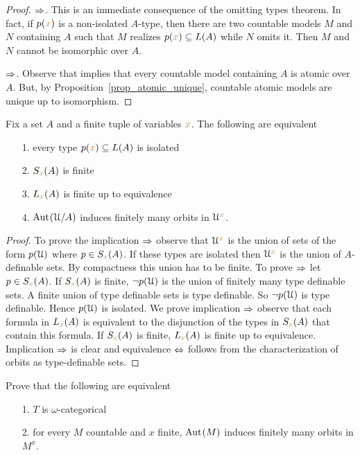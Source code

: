 \vspace*{-\parskip}
\begin{proof} $\Rightarrow$. This is an immediate consequence of the omitting types theorem.
In fact, if $p({\color{brown} x})$ is a non-isolated $A$-type, then there are two countable models $M$ and $N$ containing $A$ such that $M$ realizes $p({\color{brown} x})\subseteq L(A)$ while $N$ omits it.
Then $M$ and $N$ cannot be isomorphic over $A$.

$\Rightarrow$. Observe that  implies that every countable model containing $A$ is atomic over $A$.
But, by Proposition~\ref{prop_atomic_unique}, countable atomic models are unique up to isomorphism.
\end{proof}

\begin{proposition}\label{prop_ERNS_equivalents}
Fix a set $A$ and a finite tuple of variables ${\color{brown} x}$.
The following are equivalent\nobreak
\begin{itemize}   
\item[1.] every type $p({\color{brown} x})\subseteq L(A)$ is isolated
\item[2.] $S_{\color{brown} x}(A)$ is finite
\item[3.] $L_{\color{brown} x}(A)$ is finite up to equivalence
\item[4.] ${\rm Aut\kern.15ex}(\EuScript U/A)$ induces finitely many orbits in $\EuScript U^{\color{brown} x}$.
\end{itemize}
\end{proposition}
\begin{proof}To prove the implication $\Rightarrow$ observe that $\EuScript U^{\color{brown} x}$ is the union of sets of the form $p(\EuScript U)$ where $p\in S_{\color{brown} x}(A)$.
If these types are isolated then $\EuScript U^{\color{brown} x}$ is the union of $A$-definable sets.
By compactness this union has to be finite.
To prove $\Rightarrow$ let $p\in S_{\color{brown} x}(A)$.
If $S_{\color{brown} x}(A)$ is finite, $\neg p(\EuScript U)$ is the union of finitely many type definable sets.
A finite union of type definable sets is type definable.
So $\neg p(\EuScript U)$ is type definable.
Hence $p(\EuScript U)$ is isolated.
We prove implication $\Rightarrow$ observe that each formula in $L_{\color{brown} x}(A)$ is equivalent to the disjunction of the types in $S_{\color{brown} x}(A)$ that contain this formula.
If $S_{\color{brown} x}(A)$ is finite, $L_{\color{brown} x}(A)$ is finite up to equivalence.
Implication $\Rightarrow$ is clear and equivalence $\Leftrightarrow$ follows from the characterization of orbits as type-definable sets.
\end{proof}

\begin{exercise}\label{ex_oligomorphic}
   Prove that the following are equivalent
   \begin{itemize}   
   \item[1.] $T$ is $\omega$-categorical
   \item[2.] for every $M$ countable and $x$ finite, ${\rm Aut\kern.15ex}(M)$ induces finitely many orbits in $M^x$.
   \end{itemize}
\end{exercise}

